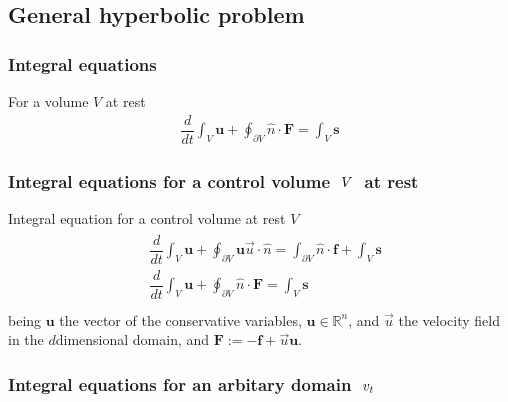 \documentclass[letterpaper,10pt,english]{jupyterBook}
\begin{document}
\sphinxstepscope


\subsection{General hyperbolic problem}
\label{\detokenize{ch/pde/hyperbolic-nd-draft:general-hyperbolic-problem}}\label{\detokenize{ch/pde/hyperbolic-nd-draft:pde-hyperbolic-nd-draft}}\label{\detokenize{ch/pde/hyperbolic-nd-draft::doc}}

\subsubsection{Integral equations}
\label{\detokenize{ch/pde/hyperbolic-nd-draft:integral-equations}}\label{\detokenize{ch/pde/hyperbolic-nd-draft:pde-hyperbolic-nd-draft-integral}}
\sphinxAtStartPar
For a volume \(V\) at rest
\begin{equation*}
\begin{split}
  \dfrac{d}{dt} \int_{V} \mathbf{u} + \oint_{\partial V} \hat{n} \cdot \mathbf{F} = \int_{V} \mathbf{s}
\end{split}
\end{equation*}\subsubsection*{Integral equations for a control volume \protect\(\ V \ \protect\) at rest}

\sphinxAtStartPar
Integral equation for a control volume at rest \(V\)
\begin{equation*}
\begin{split}\begin{aligned}
  & \dfrac{d}{dt} \int_{V} \mathbf{u} + \oint_{\partial V} \mathbf{u} \vec{u} \cdot \hat{n} = \int_{\partial V} \hat{n} \cdot \mathbf{f} + \int_{V} \mathbf{s} \\
  & \dfrac{d}{dt} \int_{V} \mathbf{u} + \oint_{\partial V} \hat{n} \cdot \mathbf{F} = \int_{V} \mathbf{s} \\
\end{aligned}\end{split}
\end{equation*}
\sphinxAtStartPar
being \(\mathbf{u}\) the vector of the conservative variables, \(\mathbf{u} \in \mathbb{R}^n\), and \(\vec{u}\) the velocity field in the \(d\)\sphinxhyphen{}dimensional domain, and \(\mathbf{F} := - \mathbf{f} + \vec{u} \mathbf{u}\).
\subsubsection*{Integral equations for an arbitary domain \protect\(\ v_t \ \protect\)}
\end{document}
